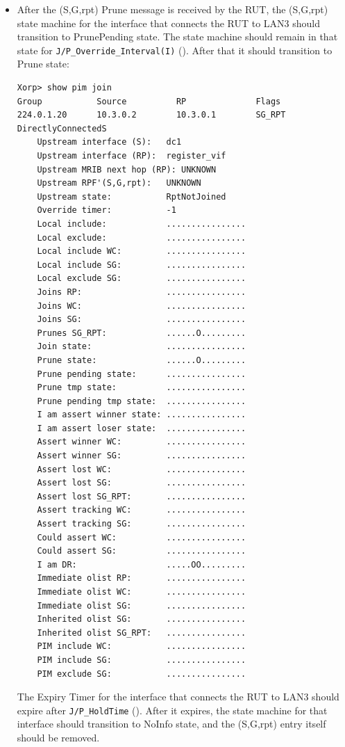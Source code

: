 \documentclass[11pt]{report}
\begin{document}

\begin{itemize}

  \item After the (S,G,rpt) Prune message is received by the RUT,
  the (S,G,rpt) state machine for the interface that connects the RUT to
  LAN3 should transition to PrunePending state. The state machine should
  remain in that state for \verb=J/P_Override_Interval(I)=
  ({\PimsmJPOverrideIntervalI}). After that it should transition to Prune
  state:

\begin{verbatim}
Xorp> show pim join 
Group           Source          RP              Flags
224.0.1.20      10.3.0.2        10.3.0.1        SG_RPT DirectlyConnectedS 
    Upstream interface (S):   dc1
    Upstream interface (RP):  register_vif
    Upstream MRIB next hop (RP): UNKNOWN
    Upstream RPF'(S,G,rpt):   UNKNOWN
    Upstream state:           RptNotJoined 
    Override timer:           -1
    Local include:            ................
    Local exclude:            ................
    Local include WC:         ................
    Local include SG:         ................
    Local exclude SG:         ................
    Joins RP:                 ................
    Joins WC:                 ................
    Joins SG:                 ................
    Prunes SG_RPT:            ......O.........
    Join state:               ................
    Prune state:              ......O.........
    Prune pending state:      ................
    Prune tmp state:          ................
    Prune pending tmp state:  ................
    I am assert winner state: ................
    I am assert loser state:  ................
    Assert winner WC:         ................
    Assert winner SG:         ................
    Assert lost WC:           ................
    Assert lost SG:           ................
    Assert lost SG_RPT:       ................
    Assert tracking WC:       ................
    Assert tracking SG:       ................
    Could assert WC:          ................
    Could assert SG:          ................
    I am DR:                  .....OO.........
    Immediate olist RP:       ................
    Immediate olist WC:       ................
    Immediate olist SG:       ................
    Inherited olist SG:       ................
    Inherited olist SG_RPT:   ................
    PIM include WC:           ................
    PIM include SG:           ................
    PIM exclude SG:           ................
\end{verbatim}

  The Expiry Timer for the interface that connects the RUT to LAN3
  should expire after \verb=J/P_HoldTime= ({\PimsmJPHoldTime}).
  After it expires, the state machine for that interface should transition to
  NoInfo state, and the (S,G,rpt) entry itself should be removed.

\end{itemize}
\end{document}
